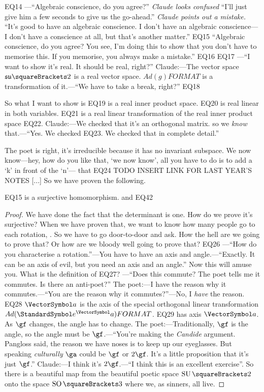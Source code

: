 \documentclass[10pt, a4paper, twoside]{lecturenotes}
\begin{document}
\begin{lecture}[date=2013-05-02]
EQ14
---``Algebraic conscience, do you agree?'' \emph{Claude looks confused} ``I'll just give him a few seconds to give us the go-ahead.'' \emph{Claude points out a mistake.} ``It's good to have an algebraic conscience. I don't have an algebraic conscience---I don't have a conscience at all, but that's another matter.''
EQ15
``Algebraic conscience, do you agree? You see, I'm doing this to show that you don't have to memorise this. If you memorise, you always make a mistake.''
EQ16
EQ17
---``I want to show it's real. It should be real, right?'' Claude:---The vector space $\LAsutwo$ is a real vector space. $Ad(g) FORMAT$ is a transformation of it.---``We have to take a break, right?''
EQ18

So what I want to show is EQ19 is a real inner product space.
EQ20 is real linear in both variables.
EQ21 is a real linear transformation of the real inner product space EQ22.
Claude:---We checked that it's an orthogonal matrix. so we \emph{know} that.---``Yes. We checked EQ23. We checked that in complete detail.'' 

The poet is right, it's irreducible because it has no invariant subspace. We now know---hey, how do you like that, `we now know', all you have to do is to add a `k' in front of the `n'--- that EQ24
TODO INSERT LINK FOR LAST YEAR'S NOTES
[...]
So we have proven the following.
\begin{proposition}
EQ15 is a surjective homomorphism.
and EQ42
\begin{proof}
We have done the fact that the determinant is one.
How do we prove it's surjective? When we have proven that, we want to know how many people go to each rotation, . So we have to go door-to-door and ask. How the hell are we going to prove that? Or how are we bloody well going to prove that?
EQ26
---``How do you characterise a rotation.''---You have to have an axis and angle.---``Exactly. It can be an axis of evil, but you need an axis and an angle.'' Now this will amuse you. What is the definition of EQ27? ---``Does this commute? The poet tells me it commutes. Is there an anti-poet?'' The poet:---I have the reason why it commutes.---``You are the reason why it commutes?''---No, I \emph{have} the reason. EQ28
$\va$ is the axis of the special orthogonal linear transformation $Ad(\E^\va) FORMAT$. 
EQ29 has axis $\va$. As $\gf$ changes, the angle has to change. The poet:---Traditionally, $\gf$ is the angle, so the angle must be $\gf$.---``You're making the \emph{Candide} argument. Pangloss said, the reason we have noses is to keep up our eyeglasses. But speaking \emph{culturally} $\ga$ could be $\gf$ or $2\gf$. It's a little proposition that it's just $\gf$.'' Claude:---I think it's $2\gf$.---``I think this is an excellent exercise''. So there is a beautiful map from the beautiful poetic space $\SpecialUnitaryGroup\of 2$ onto the space $\SpecialOrthogonalGroup\of 3$ where we, as sinners, all live.
\end{proof}
\end{proposition}

\end{lecture}
\endgroup%
\end{document}
